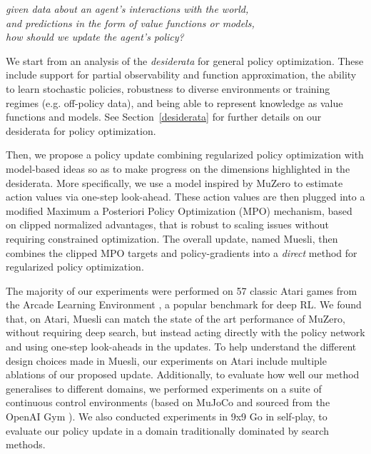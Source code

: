 \documentclass{article}
\begin{document}
\begin{center}
\textit{
given data about an agent's interactions with the world, \\and predictions in the form of value functions or models, \\how should we update the agent's policy?
}
\end{center}

We start from an analysis of the \textit{desiderata} for general policy optimization. These include support for partial observability and function approximation, the ability to learn stochastic policies, robustness to diverse environments or training regimes (e.g. off-policy data), and being able to represent knowledge as value functions and models. See Section~\ref{desiderata} for further details on our desiderata for policy optimization. 

Then, we propose a policy update combining regularized policy optimization with model-based ideas so as to make progress on the dimensions highlighted in the desiderata. More specifically, we use a model inspired by MuZero \cite{schrittwieser2019} to estimate action values via one-step look-ahead. These action values are then plugged into a modified Maximum a Posteriori Policy Optimization (MPO) \citep{abdolmaleki2018maximum} mechanism, based on clipped normalized advantages, that is robust to scaling issues without requiring constrained optimization. The overall update, named Muesli, then combines the clipped MPO targets and policy-gradients into a \emph{direct} method \cite{vieillard2020} for regularized policy optimization.

The majority of our experiments were performed on 57 classic Atari games from the Arcade Learning Environment \cite{bellemare2013arcade,machado2018revisiting}, a popular benchmark for deep RL. We found that, on Atari, Muesli can match the state of the art performance of MuZero, without requiring deep search, but instead acting directly with the policy network and using one-step look-aheads in the updates. To help understand the different design choices made in Muesli, our experiments on Atari include multiple ablations of our proposed update. Additionally, to evaluate how well our method generalises to different domains, we performed experiments on a suite of continuous control environments (based on MuJoCo and sourced from the OpenAI Gym \citep{openai2016gym}). We also conducted experiments in 9x9 Go in self-play, to evaluate our policy update in a domain traditionally dominated by search methods.
\end{document}
